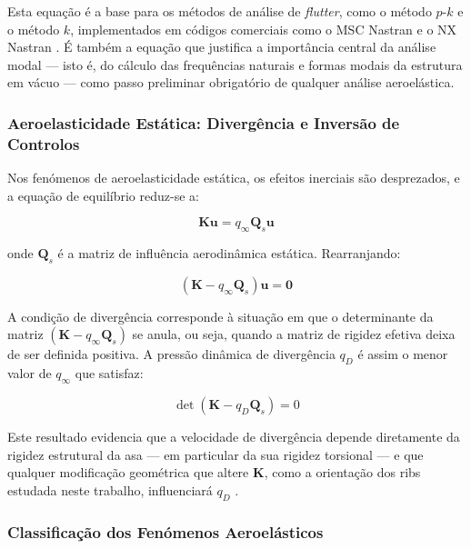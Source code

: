 \documentclass[a4paper,fleqn]{cas-sc}
\begin{document}
Esta equação é a base para os métodos de análise de \textit{flutter}, como o método $p$-$k$ e o método $k$, implementados em códigos comerciais como o MSC Nastran e o NX Nastran \cite{Nastran2014}. É também a equação que justifica a importância central da análise modal --- isto é, do cálculo das frequências naturais e formas modais da estrutura em vácuo --- como passo preliminar obrigatório de qualquer análise aeroelástica.

\subsubsection{Aeroelasticidade Estática: Divergência e Inversão de 
Controlos}

Nos fenómenos de aeroelasticidade estática, os efeitos inerciais são desprezados, e a equação de equilíbrio reduz-se a:

\begin{equation}
    \mathbf{K}\mathbf{u} = q_\infty \mathbf{Q}_s \mathbf{u}
    \label{eq:static_aero}
\end{equation}

\noindent onde $\mathbf{Q}_s$ é a matriz de influência aerodinâmica estática. Rearranjando:

\begin{equation}
    \left( \mathbf{K} - q_\infty \mathbf{Q}_s \right) \mathbf{u} = 
    \mathbf{0}
    \label{eq:divergencia}
\end{equation}

A condição de divergência corresponde à situação em que o determinante da matriz $\left( \mathbf{K} - q_\infty \mathbf{Q}_s \right)$ se anula, ou seja, quando a matriz de rigidez efetiva deixa de ser definida positiva. A pressão dinâmica de divergência $q_D$ é assim o menor valor de $q_\infty$ que satisfaz:

\begin{equation}
    \det\left( \mathbf{K} - q_D \mathbf{Q}_s \right) = 0
    \label{eq:qD}
\end{equation}

Este resultado evidencia que a velocidade de divergência depende diretamente da rigidez estrutural da asa --- em particular da sua rigidez torsional --- e que qualquer modificação geométrica que altere $\mathbf{K}$, como a orientação dos ribs estudada neste trabalho, influenciará $q_D$ \cite{Bisplinghoff1996}.

\subsubsection{Classificação dos Fenómenos Aeroelásticos}
\end{document}

